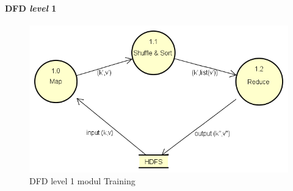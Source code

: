 \paragraph{DFD \textit{level} 1}
\label{par:DFD level 1 modul Training}

\begin{figure}[H]
	\centering
	\includegraphics[scale=0.65]{Diagram/DFD_1_0_Training_Testing}
	\caption[DFD level 1 modul Training]{DFD level 1 modul Training}
	\label{fig:DFD level 1 modul Training}
\end{figure}

